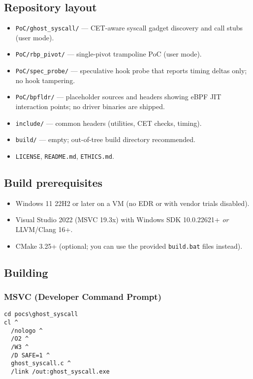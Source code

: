 \documentclass[11pt,letterpaper]{article}
\begin{document}
\subsection{Repository layout}
\begin{itemize}
  \item \texttt{PoC/ghost\_syscall/} — CET-aware syscall gadget discovery and call stubs (user mode).
  \item \texttt{PoC/rbp\_pivot/} — single-pivot trampoline PoC (user mode).
  \item \texttt{PoC/spec\_probe/} — speculative hook probe that reports timing deltas only; no hook tampering.
  \item \texttt{PoC/bpfldr/} — placeholder sources and headers showing eBPF JIT interaction points; no driver binaries are shipped.
  \item \texttt{include/} — common headers (utilities, CET checks, timing).
  \item \texttt{build/} — empty; out-of-tree build directory recommended.
  \item \texttt{LICENSE}, \texttt{README.md}, \texttt{ETHICS.md}.
\end{itemize}

\subsection{Build prerequisites}
\begin{itemize}
  \item Windows 11 22H2 or later on a VM (no EDR or with vendor trials disabled).
  \item Visual Studio 2022 (MSVC 19.3x) with Windows SDK 10.0.22621+ \emph{or} LLVM/Clang 16+.
  \item CMake 3.25+ (optional; you can use the provided \texttt{build.bat} files instead).
\end{itemize}

\subsection{Building}
\vspace{3em} 

\subsubsection*{MSVC (Developer Command Prompt)}

\begin{lstlisting}[style=cmd]
cd pocs\ghost_syscall
cl ^
  /nologo ^
  /O2 ^
  /W3 ^
  /D SAFE=1 ^
  ghost_syscall.c ^
  /link /out:ghost_syscall.exe
\end{lstlisting}
\end{document}
